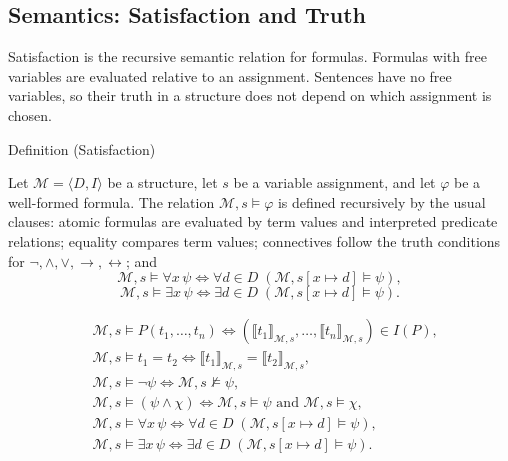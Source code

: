 
\subsection{Semantics: Satisfaction and Truth}

\begin{remark*}
Satisfaction is the recursive semantic relation for formulas. Formulas with
free variables are evaluated relative to an assignment. Sentences have no free
variables, so their truth in a structure does not depend on which assignment is
chosen.
\end{remark*}

\begin{definitionbox}{Definition (Satisfaction)}
\begin{definition}[Satisfaction]
\label{def:fol-satisfaction}
Let \(\mathcal M=\langle D,I\rangle\) be a structure, let \(s\) be a variable
assignment, and let \(\varphi\) be a well-formed formula. The relation
\(\mathcal M,s\models\varphi\) is defined recursively by the usual clauses:
atomic formulas are evaluated by term values and interpreted predicate
relations; equality compares term values; connectives follow the truth
conditions for \(\neg,\land,\lor,\to,\leftrightarrow\); and
\[
\mathcal M,s\models\forall x\,\psi
\Longleftrightarrow
\forall d\in D\;(\mathcal M,s[x\mapsto d]\models\psi),
\]
\[
\mathcal M,s\models\exists x\,\psi
\Longleftrightarrow
\exists d\in D\;(\mathcal M,s[x\mapsto d]\models\psi).
\]
\end{definition}
\end{definitionbox}

\begin{remark*}
\[
\begin{aligned}
&\mathcal M,s\models P(t_1,\ldots,t_n)
\Longleftrightarrow
(\llbracket t_1\rrbracket_{\mathcal M,s},\ldots,
\llbracket t_n\rrbracket_{\mathcal M,s})\in I(P),\\
&\mathcal M,s\models t_1=t_2
\Longleftrightarrow
\llbracket t_1\rrbracket_{\mathcal M,s}
=
\llbracket t_2\rrbracket_{\mathcal M,s},\\
&\mathcal M,s\models\neg\psi
\Longleftrightarrow
\mathcal M,s\not\models\psi,\\
&\mathcal M,s\models(\psi\land\chi)
\Longleftrightarrow
\mathcal M,s\models\psi \text{ and } \mathcal M,s\models\chi,\\
&\mathcal M,s\models\forall x\,\psi
\Longleftrightarrow
\forall d\in D\;(\mathcal M,s[x\mapsto d]\models\psi),\\
&\mathcal M,s\models\exists x\,\psi
\Longleftrightarrow
\exists d\in D\;(\mathcal M,s[x\mapsto d]\models\psi).
\end{aligned}
\]
\end{remark*}

